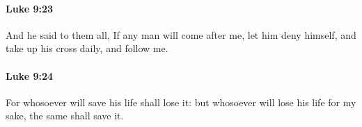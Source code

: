 		\paragraph{Luke 9:23} %
			\label{LUKE-9-23}

			And he said to them all, If any man will come after me, let him deny himself, and take up his cross daily, and follow me.

			\begin{framed}
			\scriptsize
				\begin{compactdesc}
					\item[SBLG] 
				\end{compactdesc}
			\end{framed}

		\paragraph{Luke 9:24} %
			\label{LUKE-9-24}

			For whosoever will save his life shall lose it: but whosoever will lose his life for my sake, the same shall save it.


